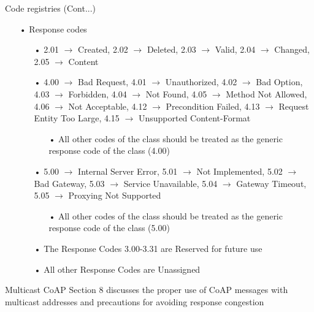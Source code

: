 \documentclass[11pt]{beamer}
\begin{document}
\begin{frame}{Code registries (Cont...)}
\begin{itemize}
\item[•] Response codes
\begin{itemize}
\item[•] 2.01 $\rightarrow$ Created, 2.02 $\rightarrow$ Deleted, 2.03 $\rightarrow$ Valid, 2.04 $\rightarrow$ Changed, 2.05 $\rightarrow$ Content
\item[•] 4.00 $\rightarrow$ Bad Request, 4.01 $\rightarrow$ Unauthorized, 4.02 $\rightarrow$ Bad Option, 4.03 $\rightarrow$ Forbidden, 4.04 $\rightarrow$ Not Found, 4.05 $\rightarrow$ Method Not Allowed, 4.06 $\rightarrow$ Not Acceptable, 4.12 $\rightarrow$ Precondition Failed, 4.13 $\rightarrow$ Request Entity Too Large, 4.15 $\rightarrow$ Unsupported Content-Format
\begin{itemize}
\item[•] All other codes of the class should be treated as the generic response code of the class (4.00)
\end{itemize}
\item[•] 5.00 $\rightarrow$ Internal Server Error, 5.01 $\rightarrow$ Not Implemented, 5.02 $\rightarrow$ Bad Gateway, 5.03 $\rightarrow$ Service Unavailable, 5.04 $\rightarrow$ Gateway Timeout, 5.05 $\rightarrow$ Proxying Not Supported
\begin{itemize}
\item[•] All other codes of the class should be treated as the generic response code of the class (5.00)
\end{itemize}
\item[•] The Response Codes 3.00-3.31 are Reserved for future use
\item[•] All other Response Codes are Unassigned
\end{itemize}
\end{itemize}
\end{frame}
\begin{frame}{Multicast CoAP}
Section 8 discusses the proper use of CoAP messages with multicast addresses and precautions for avoiding response congestion
\end{frame}
\end{document}
